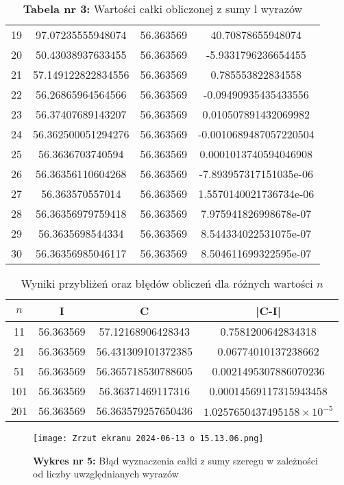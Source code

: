 \documentclass{article}
\begin{document}
\begin{table}[h!]
\begin{tabular}{cccc}
19 & 97.07235555948074 & 56.363569 & 40.70878655948074 \\
20 & 50.43038937633455 & 56.363569 & -5.9331796236654455 \\
21 & 57.149122822834556 & 56.363569 & 0.785553822834558 \\
22 & 56.26865964564566 & 56.363569 & -0.09490935435433556 \\
23 & 56.37407689143207 & 56.363569 & 0.010507891432069982 \\
24 & 56.362500051294276 & 56.363569 & -0.0010689487057220504 \\
25 & 56.3636703740594 & 56.363569 & 0.0001013740594046908 \\
26 & 56.36356110604268 & 56.363569 & -7.893957317151035e-06 \\
27 & 56.363570557014 & 56.363569 & 1.5570140021736734e-06 \\
28 & 56.36356979759418 & 56.363569 & 7.975941826998678e-07 \\
29 & 56.3635698544334 & 56.363569 & 8.544334022531075e-07 \\
30 & 56.36356985046117 & 56.363569 & 8.504611699322595e-07 \\
\bottomrule
\end{tabular}
\caption*{\textbf{Tabela nr 3:} Wartości całki obliczonej z sumy l wyrazów}
\end{table}

\begin{table}[h!]
\centering
\begin{tabular}{cccc}
\toprule
\(n\) & I & C & |C-I| \\
\midrule
11 & 56.363569 & 57.12168906428343 & 0.7581200642834318 \\
21 & 56.363569 & 56.431309101372385 & 0.06774010137238662 \\
51 & 56.363569 & 56.365718530788605 & 0.0021495307886070236 \\
101 & 56.363569 & 56.36371469117316 & 0.00014569117315943458 \\
201 & 56.363569 & 56.363579257650436 & \(1.0257650437495158 \times 10^{-5}\) \\
\bottomrule
\end{tabular}
\caption*{Wyniki przybliżeń oraz błędów obliczeń dla różnych wartości \(n\)}
\end{table}


\begin{figure}[H]
    \centering
    \texttt{[image: Zrzut ekranu 2024-06-13 o 15.13.06.png]}
    \caption{\textbf{Wykres nr 5:} Błąd wyznaczenia całki z sumy szeregu w zależności od liczby uwzględnianych wyrazów}
    \label{fig:enter-label}
\end{figure}
\end{document}

